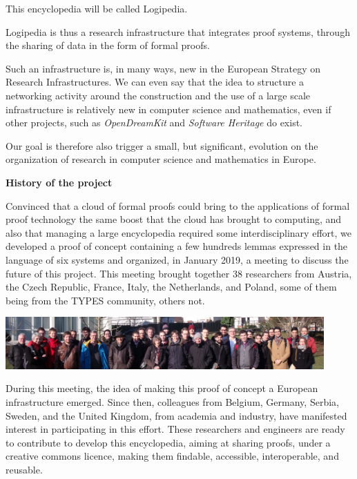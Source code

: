 This encyclopedia will be called Logipedia.

Logipedia is thus a research infrastructure that integrates proof
systems, through the sharing of data in the form of formal proofs.

\begin{center}
  
\bigstar \bigstar \bigstar

\end{center}

Such an infrastructure is, in many ways, new in the European Strategy
on Research Infrastructures. We can even say that the idea to
structure a networking activity around the construction and the use of
a large scale infrastructure is relatively new in computer science and
mathematics, even if other projects, such as {\em OpenDreamKit} and
{\em Software Heritage} do exist.

Our goal is therefore also trigger a
small, but significant, evolution on the organization of research in
computer science and mathematics in Europe.

\begin{framed}
  \vspace*{-0.5cm}
  \begin{center}
{\bf \Large History of the project}
\end{center}

Convinced that a cloud of formal proofs could bring to the
applications of formal proof technology the same boost that the cloud
has brought to computing, and also that managing a large encyclopedia
required some interdisciplinary effort,
we developed a proof of concept containing a few hundreds lemmas
expressed in the language of six systems and organized, in January 2019,
a meeting to discuss the future of this project.
This
meeting brought together 38 researchers from Austria, the Czech
Republic, France, Italy, the Netherlands, and Poland, some of them
being from the TYPES community, others not.
\begin{center}
\includegraphics[height=2cm]{photo.png}
\end{center}
During this meeting, the idea of making this proof of concept a European
infrastructure emerged.
Since then,
colleagues from Belgium, Germany, Serbia, Sweden, and the United
Kingdom, from academia and industry, have manifested interest in
participating in this effort.  These researchers and engineers are
ready to contribute to develop this encyclopedia, aiming at sharing
proofs, under a creative commons licence, making them findable,
accessible, interoperable, and reusable.
\end{framed}

